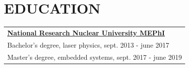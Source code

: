 \documentclass{anisyan-resume}
\begin{document}
	\section{\textbf{EDUCATION}}
	\vspace{5pt}
	\def\arraystretch{1.2}
	\begin{tabular}{ m{12cm} }
		\quad\href{https://eng.mephi.ru/}{\large \textbf{National Research Nuclear University MEPhI}} \\
		\vspace{5pt}
		\quad\normalsize{Bachelor's degree, laser physics, sept. 2013 - june 2017} \\
		\quad\normalsize{Master's degree, embedded systems, sept. 2017 - june 2019} \\
	\end{tabular}

	\vspace{5pt}
\end{document}
